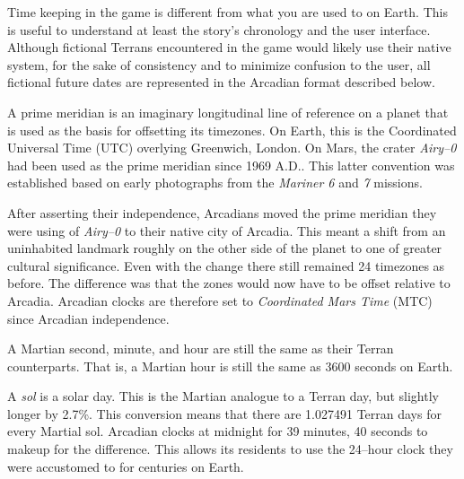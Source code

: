 

Time keeping in the game is different from what you are used to on Earth. This is useful to understand at least the story's chronology and the user interface. Although fictional Terrans encountered in the game would likely use their native system, for the sake of consistency and to minimize confusion to the user, all fictional future dates are represented in the Arcadian format described below.


A prime meridian is an imaginary longitudinal line of reference on a planet that is used as the basis for offsetting its timezones. On Earth, this is the Coordinated Universal Time (UTC) overlying Greenwich, London. On Mars, the crater {\it Airy--0} had been used as the prime meridian since 1969 A.D.. This latter convention was established based on early photographs from the {\it Mariner 6} and {\it 7} missions.

After asserting their independence, Arcadians moved the prime meridian they were using of {\it Airy--0} to their native city of Arcadia. This meant a shift from an uninhabited landmark roughly on the other side of the planet to one of greater cultural significance. Even with the change there still remained 24 timezones as before. The difference was that the zones would now have to be offset relative to Arcadia. Arcadian clocks are therefore set to {\it Coordinated Mars Time} (MTC) since Arcadian independence.


A Martian second, minute, and hour are still the same as their Terran counterparts. That is, a Martian hour is still the same as 3600 seconds on Earth.

A {\it sol} is a solar day. This is the Martian analogue to a Terran day, but slightly longer by 2.7\%. This conversion means that there are 1.027491 Terran days for every Martial sol. Arcadian clocks  at midnight for 39 minutes, 40 seconds to makeup for the difference. This allows its residents to use the 24--hour clock they were accustomed to for centuries on Earth.

